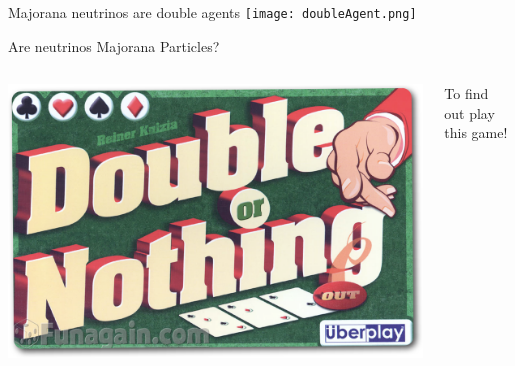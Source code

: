 \documentclass [aspectratio=169]{beamer}
\begin{document}

\begin{frame}{Majorana neutrinos are double agents}
\texttt{[image: doubleAgent.png]}
\end{frame}


\begin{frame}{Are neutrinos Majorana Particles?}

\begin{columns}
\includegraphics[scale=0.35]{DoubleOrNothing.png}

To find out play this game!   
\end{columns}
\end{frame}

\end{document}

